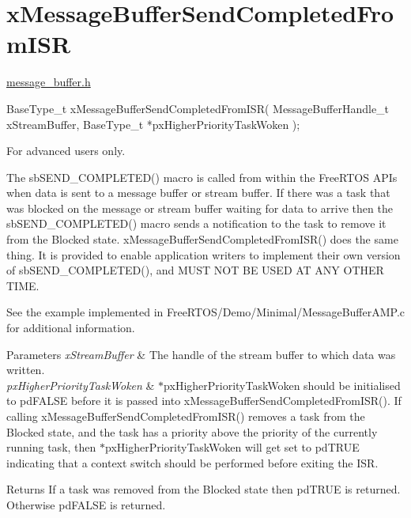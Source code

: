 \hypertarget{group__x_message_buffer_send_completed_from_i_s_r}{}\section{x\+Message\+Buffer\+Send\+Completed\+From\+I\+SR}
\label{group__x_message_buffer_send_completed_from_i_s_r}
\mbox{\hyperlink{message__buffer_8h_source}{message\+\_\+buffer.\+h}}


\begin{DoxyPre}
BaseType\_t xMessageBufferSendCompletedFromISR( MessageBufferHandle\_t xStreamBuffer, BaseType\_t *pxHigherPriorityTaskWoken );
\end{DoxyPre}


For advanced users only.

The sb\+S\+E\+N\+D\+\_\+\+C\+O\+M\+P\+L\+E\+T\+E\+D() macro is called from within the Free\+R\+T\+OS A\+P\+Is when data is sent to a message buffer or stream buffer. If there was a task that was blocked on the message or stream buffer waiting for data to arrive then the sb\+S\+E\+N\+D\+\_\+\+C\+O\+M\+P\+L\+E\+T\+E\+D() macro sends a notification to the task to remove it from the Blocked state. x\+Message\+Buffer\+Send\+Completed\+From\+I\+S\+R() does the same thing. It is provided to enable application writers to implement their own version of sb\+S\+E\+N\+D\+\_\+\+C\+O\+M\+P\+L\+E\+T\+E\+D(), and M\+U\+ST N\+OT BE U\+S\+ED AT A\+NY O\+T\+H\+ER T\+I\+ME.

See the example implemented in Free\+R\+T\+O\+S/\+Demo/\+Minimal/\+Message\+Buffer\+A\+M\+P.\+c for additional information.


\begin{DoxyParams}{Parameters}
{\em x\+Stream\+Buffer} & The handle of the stream buffer to which data was written.\\
\hline
{\em px\+Higher\+Priority\+Task\+Woken} & $\ast$px\+Higher\+Priority\+Task\+Woken should be initialised to pd\+F\+A\+L\+SE before it is passed into x\+Message\+Buffer\+Send\+Completed\+From\+I\+S\+R(). If calling x\+Message\+Buffer\+Send\+Completed\+From\+I\+S\+R() removes a task from the Blocked state, and the task has a priority above the priority of the currently running task, then $\ast$px\+Higher\+Priority\+Task\+Woken will get set to pd\+T\+R\+UE indicating that a context switch should be performed before exiting the I\+SR.\\
\hline
\end{DoxyParams}
\begin{DoxyReturn}{Returns}
If a task was removed from the Blocked state then pd\+T\+R\+UE is returned. Otherwise pd\+F\+A\+L\+SE is returned. 
\end{DoxyReturn}
